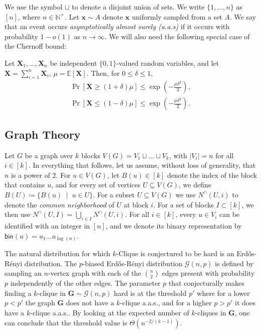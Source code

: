 \documentclass[10pt,a4paper]{article}
\makeatletter
\theoremstyle{definition}
\theoremstyle{remark}
\theoremstyle{example}
\theoremstyle{plain}
\newcommand{\calG}{\mathcal{G}}
\newcommand{\kClique}{$k$-\textsf{Clique}\xspace}
\providecommand{\erdosrenyi}{Erd\H{o}s-R\'{e}nyi\xspace}
\newcommand{\aas}{a.a.s.\@\xspace}
\makeatother
\begin{document}
We use the symbol $\sqcup$ to denote a disjoint union of sets. We write $\{1, \dots, n\}$ as $[n]$, where $n \in \mathbb{N}^+$.
Let  
$\bm x \sim A$ denote $\bm x$ uniformly sampled from a set $A$. 
We say that an event occurs \emph{asymptotically almost surely (a.a.s)} if it occurs with probability $1-o(1)$ as $n\rightarrow \infty$. We will also need the following special case of the Chernoff bound:
\begin{theorem}
Let $\bm X_1,\dots,\bm X_n$ be independent $\{0,1\}$-valued random variables, and let
$\bm X = \sum_{i=1}^n \bm X_i$, $ 
\mu = \mathbb{E}[\bm X].
$
Then, for $0\leq \delta\leq 1$,
\begin{align*}
\Pr\left[\bm X \geq (1+\delta)\mu\right] \leq \exp\left(-\frac{\mu \delta^2}{3}\right),
\\
\Pr\left[\bm X \leq (1-\delta)\mu\right] \leq \exp\left(-\frac{\mu \delta^2}{2}\right).
\end{align*}
\end{theorem}

\subsection{Graph Theory}
Let $G$ be a graph over $k$ blocks $V(G)=V_1 \sqcup \dots \sqcup V_k$, with $\lvert V_i \rvert = n$ for all $i\in [k]$.  
In everything that follows, let us assume, without loss of generality, that $n$ is a power of 2. 
For $u\in V(G)$, let $B(u)\in [k]$ denote the index of the block that contains $u$, and for every set of vertices $U \subseteq V(G)$, we define $B(U) \coloneqq \{B(u)\;\mid \; u \in U\}$. For a subset $U\subseteq V(G)$ we use $N^\cap(U,i)$ to denote the \emph{common neighborhood} of $U$ at block $i$. For a set of blocks $I \subset [k]$, we then use $N^\cap(U,I) = \bigcup_{i \in I} N^\cap(U,i)$. For all $i \in [k]$, every $u \in V_i$ can be identified with an integer in $[n]$, and we denote its binary representation by $\mathsf{bin}(u) =u_1\ldots u_{\log(n)}$.

 The natural distribution for which \kClique is conjectured to be hard is an \erdosrenyi distribution. The $p$-biased \erdosrenyi distribution $\calG(n,p)$ is defined by sampling an $n$-vertex graph with each of the $\binom{n}{2}$ edges present with probability $p$ independently of the other edges. The parameter $p$ that conjecturally makes finding a $k$-clique in $\bm{G} \sim \calG(n,p)$ hard is at the threshold $p'$ where for a lower $p<p'$ the graph $\bm G$ does not have a $k$-clique \aas, and for a higher $p>p'$ it does have a $k$-clique \aas. By looking at the expected number of $k$-cliques in $\bm G$, one can conclude that the threshold value is $\Theta(n^{-2/(k-1)})$. 
\end{document}
